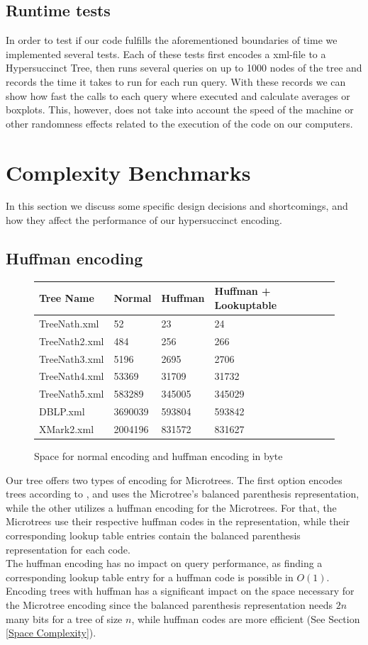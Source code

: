 \documentclass{article}
\begin{document}
\subsection{Runtime tests} \label{Runtime tests}
In order to test if our code fulfills the aforementioned boundaries of time we implemented several tests. Each of these tests first encodes a xml-file to a Hypersuccinct Tree, then runs several queries on up to 1000 nodes of the tree and records the time it takes to run for each run query. With these records we can show how fast the calls to each query where executed and calculate averages or boxplots. This, however, does not take into account the speed of the machine or other randomness effects related to the execution of the code on our computers.\\

\section{Complexity Benchmarks} \label{Complexity Benchmarks}
In this section we discuss some specific design decisions and shortcomings, and how they affect the performance of our hypersuccinct encoding.
\subsection{Huffman encoding}
\begin{figure}[h]
	\begin{tabular}{ |p{4.5cm}||p{2cm}|p{2cm}|p{4cm}|  }
		 \hline
		 Tree Name & Normal &Huffman &Huffman + Lookuptable\\
		 \hline
		 TreeNath.xml 		&52    		&23 		&24 		\\
		 TreeNath2.xml		&484  		&256   	&266 		\\
		 TreeNath3.xml		&5196 	&2695		&2706		\\
		 TreeNath4.xml		&53369	&31709	&31732	\\
		 TreeNath5.xml		&583289	&345005	&345029	\\
		 DBLP.xml			&3690039	&593804	&593842	\\
		 XMark2.xml			&2004196	&831572	&831627	\\
		 \hline
	\end{tabular}
\caption{Space for normal encoding and huffman encoding in byte}
\label{huff:table1}
\end{figure}
Our tree offers two types of encoding for Microtrees. The first option encodes trees according to \cite{farzanMunro}, and uses the Microtree's balanced parenthesis representation, while the other utilizes a huffman encoding for the Microtrees. For that, the Microtrees use their respective huffman codes in the representation, while their corresponding lookup table entries contain the balanced parenthesis representation for each code.\\
The huffman encoding has no impact on query performance, as finding a corresponding lookup table entry for a huffman code is possible in $O(1)$. Encoding trees with huffman has a significant impact on the space necessary for the Microtree encoding since the balanced parenthesis representation needs $2n$ many bits for a tree of size $n$, while huffman codes are more efficient (See Section \ref{Space Complexity}).
\end{document}
